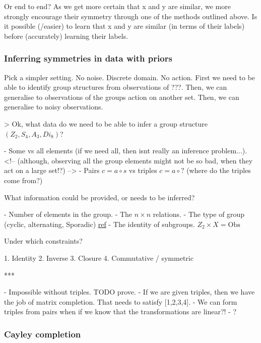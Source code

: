 \cite{Yang2019}

Or end to end? As we get more certain that x and y are similar, we more strongly
encourage their symmetry through one of the methods outlined above.
Is it possible (/easier) to learn that x and y are similar (in terms of their labels) before (accurately) learning their labels.


\subsubsection{Inferring symmetries in data with priors}

Pick a simpler setting. No noise. Discrete domain. No action.
First we need to be able to identify group structures from observations of ???.
Then, we can generalise to observations of the groups action on another set.
Then, we can generalise to noisy observations.


> Ok, what data do we need to be able to infer a group structure $(Z_2, S_4, A_3, Di_8)$?

- Some vs all elements (if we need all, then isnt really an inference problem...).
<!-- (although, observing all the group elements might not be so bad, when they act on a large set!?) -->
- Pairs $c = a \circ s$ vs triples $c = a \circ ?$ (where do the triples come from?)

What information could be provided, or needs to be inferred?

- Number of elements in the group.
- The $n\times n$ relations.
- The type of group (cyclic, alternating, Sporadic) \href{https://en.wikipedia.org/wiki/Classification_of_finite_simple_groups}{ref}
- The identity of subgroups. $Z_2 \times X = \text{Obs}$

Under which constraints?

1. Identity
2. Inverse
3. Closure
4. Commutative / symmetric

***

- Impossible without triples. TODO prove.
- If we are given triples, then we have the job of matrix completion. That needs to satisfy [1,2,3,4].
- We can form triples from pairs when if we know that the transformations are linear?!
- ?

\subsubsection{Cayley completion}

